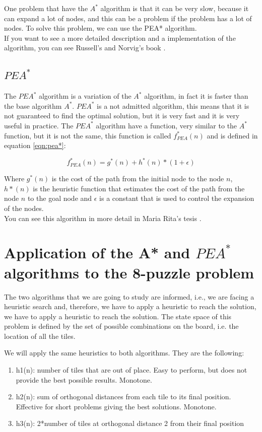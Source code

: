 \documentclass[runningheads]{llncs}
\begin{document}
One problem that have the \(A^*\) algorithm is that it can be very slow, because it can expand a lot of nodes, and this can be a problem if the problem has a lot of nodes. To solve this problem, we can use the PEA* algorithm.\\
If you want to see a more detailed description and a implementation of the algorithm, you can see Russell's and Norvig's book \cite{algorithms_2}.

\subsection{\(PEA^*\)}
The \(PEA^*\) algorithm is a variation of the \(A^*\) algorithm, in fact it is faster than the base algorithm \(A^*\).
\(PEA^*\) is a not admitted algorithm, this means that it is not guaranteed to find the optimal solution, but it is very fast and it is very useful in practice.
The \(PEA^*\) algorithm have a function, very similar to the \(A^*\) function, but it is not the same, this function is called \(f_{PEA}^*(n)\) and is defined in equation \ref{eqn:pea*}:

\begin{equation}\label{eqn:pea*}
f_{PEA}^*(n) = g^*(n) + h^*(n) * (1 + \epsilon)
\end{equation}

Where \(g^*(n)\) is the cost of the path from the initial node to the node \(n\), 
\(h*(n)\) is the heuristic function that estimates the cost of the path from the node \(n\) to the goal node and 
\(\epsilon\) is a constant that is used to control the expansion of the nodes.\\
You can see this algorithm in more detail in Maria Rita's tesis \cite{algorithms_5}.

\section{Application of the A* and \(PEA^*\) algorithms to the 8-puzzle problem}
The two algorithms that we are going to study are informed, i.e., we are facing a heuristic search and, therefore, we have to apply a heuristic to reach the solution, 
we have to apply a heuristic to reach the solution. The state space of this problem is defined by 
the set of possible combinations on the board, i.e. the location of all the tiles.

We will apply the same heuristics to both algorithms. They are the following:
\begin{enumerate}
    \item h1(n): number of tiles that are out of place. Easy to perform, but does not provide the best possible results. Monotone.
    \item h2(n): sum of orthogonal distances from each tile to its final position. Effective for short problems giving the best solutions. Monotone.
    \item h3(n): 2*number of tiles at orthogonal distance 2 from their final position
\end{enumerate}
\end{document}
